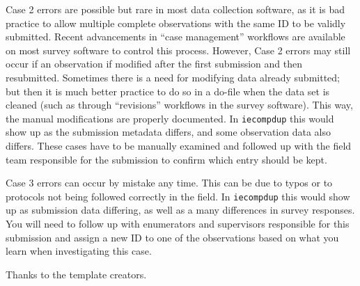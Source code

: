 \documentclass{tufte-handout}
\begin{document}
Case 2 errors are possible but rare in most data collection software,
as it is bad practice to allow multiple complete observations with the same ID
to be validly submitted. Recent advancements in ``case management'' workflows are available
on most survey software to control this process.
However, Case 2 errors may still occur if an observation if modified after the first submission and then resubmitted.
Sometimes there is a need for modifying data already submitted;
but then it is much better practice to do so in a do-file when the data set is cleaned
(such as through ``revisions'' workflows in the survey software).
This way, the manual modifications are properly documented.
In \texttt{iecompdup} this would show up as the submission metadata differs,
and some observation data also differs.
These cases have to be manually examined and followed up
with the field team responsible for the submission to confirm which entry should be kept.

Case 3 errors can occur by mistake any time.
This can be due to typos or to protocols not being followed correctly in the field.
In \texttt{iecompdup}  this would show up as submission data differing,
as well as a many differences in survey responses.
You will need to follow up with enumerators and supervisors responsible
for this submission and assign a new ID to one of the observations
based on what you learn when investigating this case.


\begin{figure}[h]
{
}
\end{figure}

\begin{figure}[h]
{
}
\end{figure}

\begin{figure}[h]
{
}
\end{figure}

\begin{figure}[h]
{
}
\end{figure}

Thanks to the template creators.\cite{tuftelatex}



\end{document}
